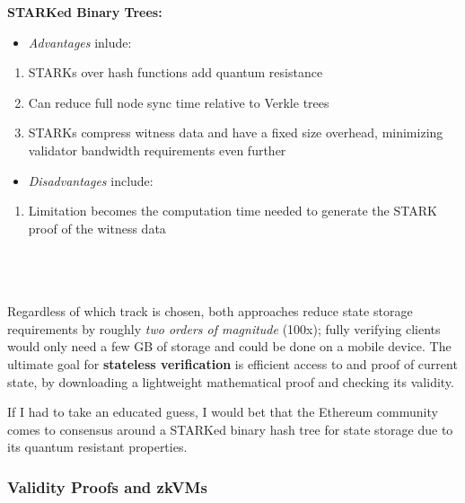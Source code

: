 \documentclass[12pt]{article}
\begin{document}
\begin{minipage}[t]{0.48\textwidth} %
\textbf{STARKed Binary Trees:}

\begin{itemize}
    \item[] \textit{Advantages} inlude:
\end{itemize}

    \begin{enumerate}
        \item STARKs over hash functions add quantum resistance
        \item Can reduce full node sync time relative to Verkle trees
        \item STARKs compress witness data and have a fixed size overhead, minimizing validator bandwidth requirements even further
    \end{enumerate}

\begin{itemize}
    \item[] \textit{Disadvantages} include:
\end{itemize}

    \begin{enumerate}
        \item Limitation becomes the computation time needed to generate the STARK proof of the witness data

    \end{enumerate}
    
\end{minipage}\\
\\
\\
Regardless of which track is chosen, both approaches reduce state storage requirements by roughly \textit{two orders of magnitude} (100x); fully verifying clients would only need a few GB of storage and could be done on a mobile device. The ultimate goal for \textbf{stateless verification} is efficient access to and proof of current state, by downloading a lightweight mathematical proof and checking its validity. 

If I had to take an educated guess, I would bet that the Ethereum community comes to consensus around a STARKed binary hash tree for state storage due to its quantum resistant properties. 

\subsubsection{Validity Proofs and zkVMs}
\label{Validity Proofs}
\end{document}
